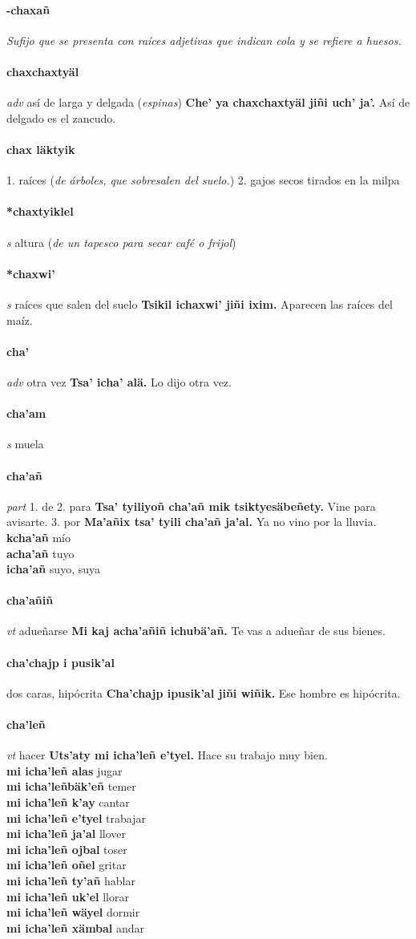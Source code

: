 \documentclass{scrbook}
\newcommand{\entry}[1]{\paragraph{#1}}
\newcommand{\onedefinition}[1]{#1.}
\newcommand{\nontranslationdef}[1]{\textit{#1}}
\newcommand{\partofspeech}[1]{\textit{#1}}
\newcommand{\spanishtranslation}[1]{#1}
\newcommand{\clarification}[1]{(\textit{#1})}
\newcommand{\cholexample}[1]{\textbf{#1}}
\newcommand{\exampletranslation}[1]{#1}
\newcommand{\secondaryentry}[1]{\\\textbf{#1}}
\newcommand{\secondtranslation}[1]{#1}
\begin{document}
\begin{multicols}{2}
\entry{-chaxañ}
\nontranslationdef{Sufijo que se presenta con raíces adjetivas que indican cola y se refiere a huesos.}

\entry{chaxchaxtyäl}
\partofspeech{adv}
\spanishtranslation{así de larga y delgada}
\clarification{espinas}
\cholexample{Che' ya chaxchaxtyäl jiñi uch' ja'.}
\exampletranslation{Así de delgado es el zancudo.}

\entry{chax läktyik}
\onedefinition{1}
\spanishtranslation{raíces}
\clarification{de árboles, que sobresalen del suelo.}
\onedefinition{2}
\spanishtranslation{gajos secos tirados en la milpa}

\entry{*chaxtyiklel}
\partofspeech{s}
\spanishtranslation{altura}
\clarification{de un tapesco para secar café o frijol}

\entry{*chaxwi'}
\partofspeech{s}
\spanishtranslation{raíces que salen del suelo}
\cholexample{Tsikil ichaxwi' jiñi ixim.}
\exampletranslation{Aparecen las raíces del maíz.}

\entry{cha'}
\partofspeech{adv}
\spanishtranslation{otra vez}
\cholexample{Tsa' icha' alä.}
\exampletranslation{Lo dijo otra vez.}

\entry{cha'am}
\partofspeech{s}
\spanishtranslation{muela}

\entry{cha'añ}
\partofspeech{part}
\onedefinition{1}
\spanishtranslation{de}
\onedefinition{2}
\spanishtranslation{para}
\cholexample{Tsa' tyiliyoñ cha'añ mik tsiktyesäbeñety.}
\exampletranslation{Vine para avisarte.}
\onedefinition{3}
\spanishtranslation{por}
\cholexample{Ma'añix tsa' tyili cha'añ ja'al.}
\exampletranslation{Ya no vino por la lluvia.}
\secondaryentry{kcha'añ}
\secondtranslation{mío}
\secondaryentry{acha'añ}
\secondtranslation{tuyo}
\secondaryentry{icha'añ}
\secondtranslation{suyo, suya}

\entry{cha'añiñ}
\partofspeech{vt}
\spanishtranslation{adueñarse}
\cholexample{Mi kaj acha'añiñ ichubä'añ.}
\exampletranslation{Te vas a adueñar de sus bienes.}

\entry{cha'chajp i pusik'al}
\spanishtranslation{dos caras, hipócrita}
\cholexample{Cha'chajp ipusik'al jiñi wiñik.}
\exampletranslation{Ese hombre es hipócrita.}

\entry{cha'leñ}
\partofspeech{vt}
\spanishtranslation{hacer}
\cholexample{Uts'aty mi icha'leñ e'tyel.}
\exampletranslation{Hace su trabajo muy bien.}
\secondaryentry{mi icha'leñ alas}
\secondtranslation{jugar}
\secondaryentry{mi icha'leñbäk'eñ}
\secondtranslation{temer}
\secondaryentry{mi icha'leñ k'ay}
\secondtranslation{cantar}
\secondaryentry{mi icha'leñ e'tyel}
\secondtranslation{trabajar}
\secondaryentry{mi icha'leñ ja'al}
\secondtranslation{llover}
\secondaryentry{mi icha'leñ ojbal}
\secondtranslation{toser}
\secondaryentry{mi icha'leñ oñel}
\secondtranslation{gritar}
\secondaryentry{mi icha'leñ ty'añ}
\secondtranslation{hablar}
\secondaryentry{mi icha'leñ uk'el}
\secondtranslation{llorar}
\secondaryentry{mi icha'leñ wäyel}
\secondtranslation{dormir}
\secondaryentry{mi icha'leñ xämbal}
\secondtranslation{andar}


\end{multicols}
\end{document}
